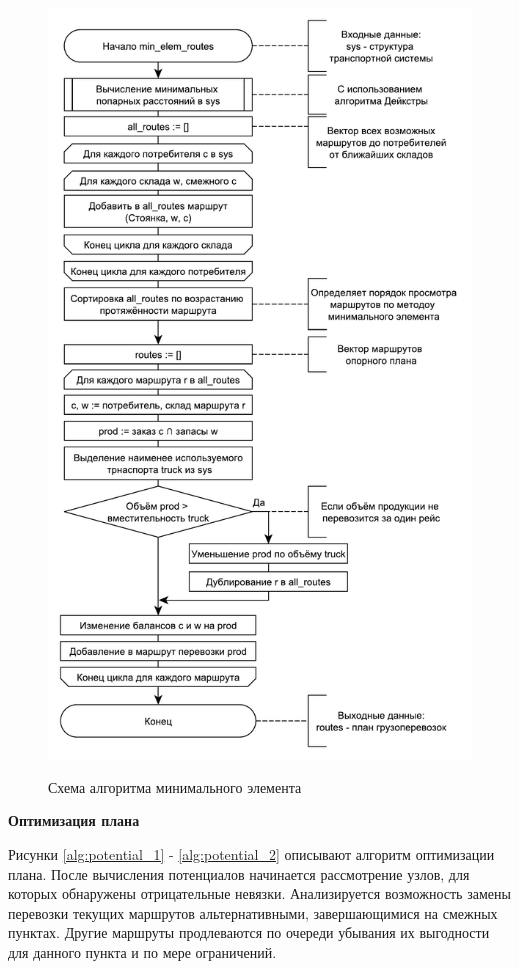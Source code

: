 \begin{figure}[hp]
	\begin{center}
		{\includegraphics[scale=0.75, angle=0, page=1]{img/min_elem_routes.pdf}}
		\caption{Схема алгоритма минимального элемента}
		\label{alg:min_elem}
	\end{center}
\end{figure}

\textbf{Оптимизация плана}

Рисунки \ref{alg:potential_1} - \ref{alg:potential_2} описывают алгоритм оптимизации плана. После вычисления потенциалов начинается рассмотрение узлов, для которых обнаружены отрицательные невязки. Анализируется возможность замены перевозки текущих маршрутов альтернативными, завершающимися на смежных пунктах. Другие маршруты продлеваются по очереди убывания их выгодности для данного пункта и по мере ограничений.

